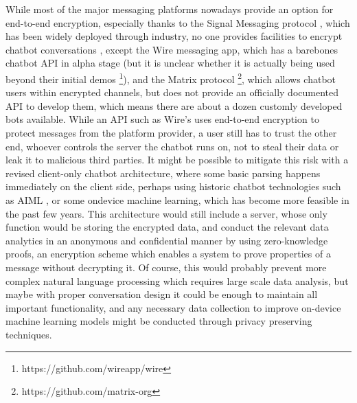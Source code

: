 While most of the major messaging platforms nowadays provide an option for end-to-end encryption, especially thanks to the Signal Messaging protocol \cite{signal}, which has been widely deployed through industry, no one provides facilities to encrypt chatbot conversations \cite{Alesanco2018}, except the Wire messaging app, which has a barebones chatbot API in alpha stage (but it is unclear whether it is actually being used beyond their initial demos \footnote{https://github.com/wireapp/wire}), and the Matrix protocol \footnote{https://github.com/matrix-org}, which allows chatbot users within encrypted channels, but does not provide an officially documented API to develop them, which means there are about a dozen customly developed bots available. While an API such as Wire's uses end-to-end encryption to protect messages from the platform provider, a user still has to trust the other end, whoever controls the server the chatbot runs on, not to steal their data or leak it to malicious third parties. It might be possible to mitigate this risk with a revised client-only chatbot architecture, where some basic parsing happens immediately on the client side, perhaps using historic chatbot technologies such as AIML \cite{aiml}, or some ondevice machine learning, which has become more feasible in the past few years. This architecture would still include a server, whose only function would be storing the encrypted data, and conduct the relevant data analytics in an anonymous and confidential manner by using zero-knowledge proofs, an encryption scheme which enables a system to prove properties of a message without decrypting it. Of course, this would probably prevent more complex natural language processing which requires large scale data analysis, but maybe with proper conversation design it could be enough to maintain all important functionality, and any necessary data collection to improve on-device machine learning models might be conducted through privacy preserving techniques.
